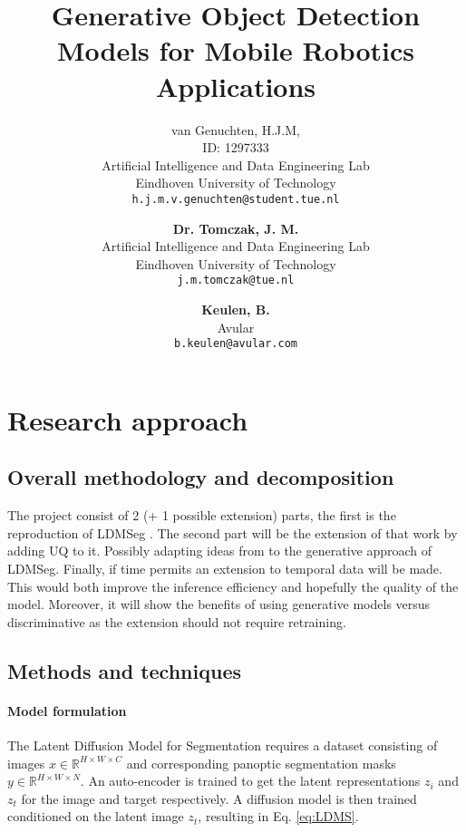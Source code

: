 \documentclass{article}
\title{Generative Object Detection Models for Mobile Robotics Applications}
\author{
 van Genuchten, H.J.M, \\
 ID: 1297333\\
 Artificial Intelligence and Data Engineering Lab\\
Eindhoven University of Technology\\
  \texttt{h.j.m.v.genuchten@student.tue.nl} \\
  \and
    \textbf{Dr. Tomczak, J. M.} \\
    Artificial Intelligence and Data Engineering Lab \\
    Eindhoven University of Technology \\
    \texttt{j.m.tomczak@tue.nl} \\
    \and
    \textbf{Keulen, B.} \\
    Avular \\
    \texttt{b.keulen@avular.com}

}
\begin{document}





\section{Research approach}
\label{sec:approach}
\subsection{Overall methodology and decomposition}


The project consist of 2 (+ 1 possible extension) parts, the first is the reproduction of LDMSeg \cite{vangansbeke2024ldmseg}. The second part will be the extension of that work by adding UQ to it. Possibly adapting ideas from \citep{gasperini2023segmenting} to the generative approach of LDMSeg. Finally, if time permits an extension to temporal data will be made. This would both improve the inference efficiency and hopefully the quality of the model. Moreover, it will show the benefits of using generative models versus discriminative as the extension should not require retraining.


\subsection{Methods and techniques}

\paragraph*{Model formulation} The Latent Diffusion Model for Segmentation requires a dataset consisting of images $x \in \mathbb{R}^{H\times W\times C}$ and corresponding panoptic segmentation masks $y \in \mathbb{R}^{H\times W\times N}$. An auto-encoder is trained to get the latent representations $z_i$ and $z_t$ for the image and target respectively. A diffusion model is then trained conditioned on the latent image $z_t$, resulting in Eq. \ref{eq:LDMS}.
\end{document}
